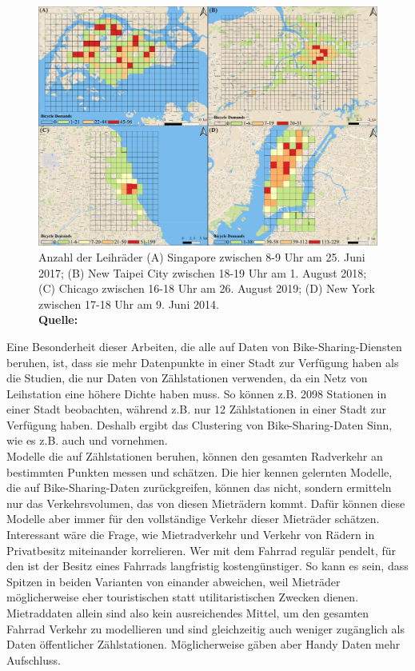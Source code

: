 \documentclass[a4paper,12pt]{thesis}
\newcommand*{\captionsource}[2]{%
	\caption[{#1}]{%
		#1%
		\\\hspace{\linewidth}%
		\textbf{Quelle:} #2%
	}%
}
\begin{document}
\begin{figure}[!ht]
	\centering
	\includegraphics[width=\textwidth]{Plots/Li2022.png}
	\captionsource{Anzahl der Leihräder (A) Singapore zwischen 8-9 Uhr am 25. Juni 2017; (B) New Taipei City zwischen 18-19 Uhr am 1. August 2018; (C) Chicago zwischen 16-18 Uhr am 26. August 2019; (D) New York zwischen 17-18 Uhr am 9. Juni 2014.}{
		\cite{Li2022}
	}
	\label{LiBild}
\end{figure}
Eine Besonderheit dieser Arbeiten, die alle auf Daten von Bike-Sharing-Diensten beruhen, ist, dass sie mehr Datenpunkte in einer Stadt zur Verfügung haben als die Studien, die nur Daten von Zählstationen verwenden, da ein Netz von Leihstation eine höhere Dichte haben muss. So können \cite{Gao2022} z.B. 2098 Stationen in einer Stadt beobachten, während \cite{Broucke2019} z.B. nur 12 Zählstationen in einer Stadt zur Verfügung haben. Deshalb ergibt das Clustering von Bike-Sharing-Daten Sinn, wie es z.B. auch \cite{Xu2013} und \cite{Li2015} vornehmen.\\
Modelle die auf Zählstationen beruhen, können den gesamten Radverkehr an bestimmten Punkten messen und schätzen. Die hier kennen gelernten Modelle, die auf Bike-Sharing-Daten zurückgreifen, können das nicht, sondern ermitteln nur das Verkehrsvolumen, das von diesen Mieträdern kommt. Dafür können diese Modelle aber immer für den vollständige Verkehr dieser Mieträder schätzen. Interessant wäre die Frage, wie Mietradverkehr und Verkehr von Rädern in Privatbesitz miteinander korrelieren. Wer mit dem Fahrrad regulär pendelt, für den ist der Besitz eines Fahrrads langfristig kostengünstiger. So kann es sein, dass Spitzen in beiden Varianten von einander abweichen, weil Mieträder möglicherweise eher touristischen statt utilitaristischen Zwecken dienen. Mietraddaten allein sind also kein ausreichendes Mittel, um den gesamten Fahrrad Verkehr zu modellieren und sind gleichzeitig auch weniger zugänglich als Daten öffentlicher Zählstationen. Möglicherweise gäben aber Handy Daten mehr Aufschluss.
\end{document}
